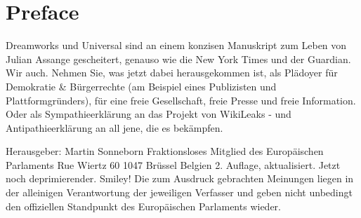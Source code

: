 



\renewcommand{\thechapter}{\Roman{chapter}}

\maketitle %

\chapter*{Preface}

Dreamworks und Universal sind an einem konzisen Manuskript zum
Leben von Julian Assange gescheitert, genauso wie die New York Times
und der Guardian.
Wir auch.
Nehmen Sie, was jetzt dabei herausgekommen ist, als Plädoyer für Demokratie \& Bürgerrechte (am Beispiel eines Publizisten und Plattformgründers), für eine freie Gesellschaft, freie Presse und freie Information.
Oder als Sympathieerklärung an das Projekt von WikiLeaks - und Antipathieerklärung an all jene, die es bekämpfen.


Herausgeber:
Martin Sonneborn
Fraktionsloses Mitglied des Europäischen Parlaments
Rue Wiertz 60
1047 Brüssel
Belgien
2. Auflage, aktualisiert. Jetzt noch deprimierender. Smiley!
Die zum Ausdruck gebrachten Meinungen liegen in der alleinigen Verantwortung der jeweiligen Verfasser
und geben nicht unbedingt den offiziellen Standpunkt des Europäischen Parlaments wieder.

\tableofcontents


